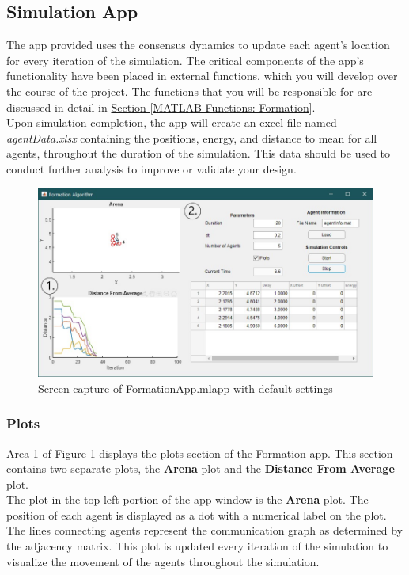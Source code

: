 \documentclass[../CourseManual.tex]{subfiles}
\begin{document}
\subsection{Simulation App} \label{Simulation App: Formation}
The app provided uses the consensus dynamics to update each agent's location for every iteration of the simulation. The critical components of the app's functionality have been placed in external functions, which you will develop over the course of the project. The functions that you will be responsible for are discussed in detail in \hyperref[MATLAB Functions: Formation]{Section \ref{MATLAB Functions: Formation}}. \\

Upon simulation completion, the app will create an excel file named \textit{agentData.xlsx} containing the positions, energy, and distance to mean for all agents, throughout the duration of the simulation. This data should be used to conduct further analysis to improve or validate your design.

\begin{figure}[H]
    \centering
    \includegraphics[width=350pt]{media/Formation.jpg}
    \caption{Screen capture of FormationApp.mlapp with default settings}
    \label{fig: formation app}
\end{figure}

\subsubsection{Plots}
Area 1 of Figure \ref{fig: formation app} displays the plots section of the Formation app. This section contains two separate plots, the \textbf{Arena} plot and the \textbf{Distance From Average} plot. \\

The plot in the top left portion of the app window is the \textbf{Arena} plot. The position of each agent is displayed as a dot with a numerical label on the plot. The lines connecting agents represent the communication graph as determined by the adjacency matrix. This plot is updated every iteration of the simulation to visualize the movement of the agents throughout the simulation. \\
\end{document}
